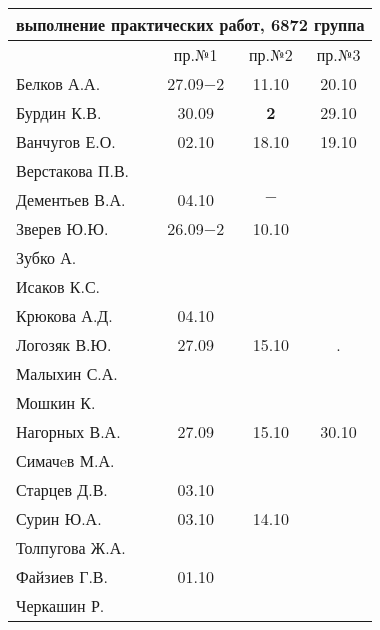 \documentclass[a4paper,landscape,11pt]{article}
\begin{document}
\newpage
\begin{tabular}{l|ccc}
\multicolumn{4}{c}{выполнение практических работ, 6872 группа} \\
\toprule
& пр.№1 & пр.№2 & пр.№3 \\
\midrule
Белков А.А.    &27.09$-2$&11.10  &20.10\\   
Бурдин К.В.    &30.09    &{\bf 2}&29.10\\
Ванчугов Е.О.  &02.10    &18.10  &19.10\\
Верстакова П.В.&         &       &\\
Дементьев В.А. &04.10    &$-$    &\\
Зверев Ю.Ю.    &26.09$-2$&10.10  &\\
Зубко А.       &         &       &\\
Исаков К.С.    &         &       &\\
Крюкова А.Д.   &04.10    &       &\\
Логозяк В.Ю.   &27.09    &15.10  &  .  \\
Малыхин С.А.   &         &       &\\
Мошкин К.      &         &       &\\
Нагорных В.А.  &27.09    &15.10  &30.10\\
Симачeв М.А.   &         &       &\\
Старцев Д.В.   &03.10    &       &\\
Сурин Ю.А.     &03.10    &14.10  &\\
Толпугова Ж.А. &         &       &\\
Файзиев Г.В.   &01.10    &       &\\
Черкашин Р.    &         &       &\\
\bottomrule
\end{tabular}
\end{document}
